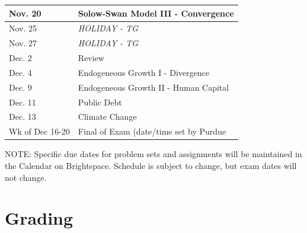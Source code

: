 \documentclass[11pt]{article}
\begin{document}
{\begin{tabular}{|l|l|}
			\hline
			Nov. 20 & Solow-Swan Model III - Convergence\\
			\hline
			Nov. 25 & \textit{HOLIDAY - TG}\\
			\hline
			Nov. 27 & \textit{HOLIDAY - TG}\\
			\hline
			Dec. 2 & Review\\
			\hline
			Dec. 4 & Endogeneous Growth I - Divergence \\
			\hline
			Dec. 9 & Endogeneous Growth II - Human Capital\\
			\hline
			Dec. 11 & Public Debt\\
			\hline
			Dec. 13 & Climate Change\\
			\hline
			Wk of Dec 16-20 & Final of Exam (date/time set by Purdue\\
		\hline
		\end{tabular}
		
	}
	
	\vspace{0.25in}
	
	NOTE: Specific due dates for problem sets and assignments will be maintained in the Calendar on Brightspace. Schedule is subject to change, but exam dates will not change. 
	
	\pagebreak
	
	\section{Grading}
	
\end{document}
